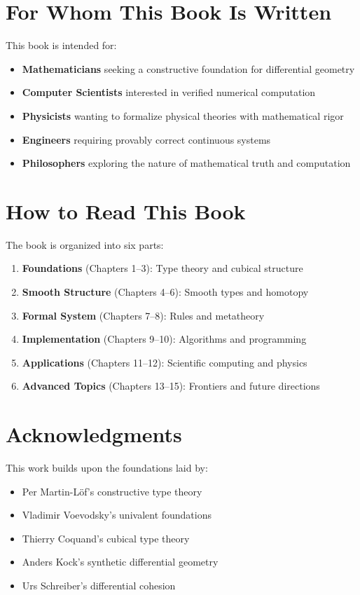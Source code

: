 \documentclass[12pt,openright,twoside]{book}
\theoremstyle{plain}
\theoremstyle{definition}
\theoremstyle{remark}
\begin{document}
\section*{For Whom This Book Is Written}

This book is intended for:
\begin{itemize}
\item \textbf{Mathematicians} seeking a constructive foundation for differential geometry
\item \textbf{Computer Scientists} interested in verified numerical computation
\item \textbf{Physicists} wanting to formalize physical theories with mathematical rigor
\item \textbf{Engineers} requiring provably correct continuous systems
\item \textbf{Philosophers} exploring the nature of mathematical truth and computation
\end{itemize}

\section*{How to Read This Book}

The book is organized into six parts:
\begin{enumerate}
\item \textbf{Foundations} (Chapters 1–3): Type theory and cubical structure
\item \textbf{Smooth Structure} (Chapters 4–6): Smooth types and homotopy
\item \textbf{Formal System} (Chapters 7–8): Rules and metatheory
\item \textbf{Implementation} (Chapters 9–10): Algorithms and programming
\item \textbf{Applications} (Chapters 11–12): Scientific computing and physics
\item \textbf{Advanced Topics} (Chapters 13–15): Frontiers and future directions
\end{enumerate}

\section*{Acknowledgments}

This work builds upon the foundations laid by:
\begin{itemize}
\item Per Martin-Löf's constructive type theory
\item Vladimir Voevodsky's univalent foundations
\item Thierry Coquand's cubical type theory
\item Anders Kock's synthetic differential geometry
\item Urs Schreiber's differential cohesion
\end{itemize}
\end{document}
